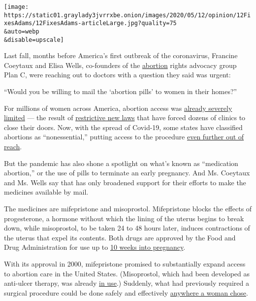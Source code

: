 \texttt{[image: https://static01.graylady3jvrrxbe.onion/images/2020/05/12/opinion/12FixesAdams/12FixesAdams-articleLarge.jpg?quality=75\\\&auto=webp\\\&disable=upscale]}

Last fall, months before America's first outbreak of the coronavirus,
Francine Coeytaux and Elisa Wells, co-founders of the
\href{https://www.nytimes3xbfgragh.onion/2020/06/29/us/abortion-supreme-court.html}{abortion}
rights advocacy group Plan C, were reaching out to doctors with a
question they said was urgent:

``Would you be willing to mail the `abortion pills' to women in their
homes?''

For millions of women across America, abortion access was
\href{https://www.nytimes3xbfgragh.onion/interactive/2019/05/31/us/abortion-clinics-map.html}{already
severely limited} --- the result of
\href{https://www.nytimes3xbfgragh.onion/2019/05/29/us/louisiana-abortion-heartbeat-bill.html}{restrictive
new laws} that have forced dozens of clinics to close their doors. Now,
with the spread of Covid-19, some states have classified abortions as
``nonessential,'' putting access to the procedure
\href{https://www.nytimes3xbfgragh.onion/2020/03/23/us/coronavirus-texas-ohio-abortion.html}{even
further out of reach}.

But the pandemic has also shone a spotlight on what's known as
``medication abortion,'' or the use of pills to terminate an early
pregnancy. And Ms. Coeytaux and Ms. Wells say that has only broadened
support for their efforts to make the medicines available by mail.

The medicines are mifepristone and misoprostol. Mifepristone blocks the
effects of progesterone, a hormone without which the lining of the
uterus begins to break down, while misoprostol, to be taken 24 to 48
hours later, induces contractions of the uterus that expel its contents.
Both drugs are approved by the Food and Drug Administration for use up
to
\href{https://www.nytimes3xbfgragh.onion/2016/03/31/health/abortion-pill-mifeprex-ru-486-fda.html}{10
weeks into pregnancy}.

With its approval in 2000, mifepristone promised to substantially expand
access to abortion care in the United States. (Misoprostol, which had
been developed as anti-ulcer therapy, was already
\href{https://www.nytimes3xbfgragh.onion/2016/06/28/opinion/from-uruguay-a-model-for-making-abortion-safer.html}{in
use}.) Suddenly, what had previously required a surgical procedure could
be done safely and effectively
\href{https://www.guttmacher.org/journals/psrh/2004/01/convincing-new-providers-offer-medical-abortion-what-will-it-take}{anywhere
a woman chose}.

